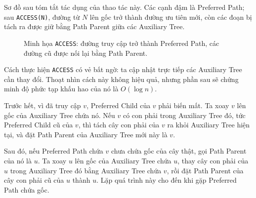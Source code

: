 \documentclass[11pt]{article}
\begin{document}
Sơ đồ sau tóm tắt tác dụng của thao tác này. Các cạnh đậm là Preferred Path;
sau \texttt{ACCESS(N)}, đường từ \(N\) lên gốc trở thành đường ưu tiên mới, còn
các đoạn bị tách ra được giữ bằng Path Parent giữa các Auxiliary Tree.

\begin{figure}[ht]
\centering
{}
\caption{Minh họa \texttt{ACCESS}: đường truy cập trở thành Preferred Path, các đường cũ được nối lại bằng Path Parent.}
\end{figure}

Cách thực hiện \texttt{ACCESS} có vẻ bất ngờ: ta cập nhật trực tiếp các
Auxiliary Tree cần thay đổi. Thoạt nhìn cách này không hiệu quả, nhưng phần
sau sẽ chứng minh độ phức tạp khấu hao của nó là $O(\log n)$.

Trước hết, vì đã truy cập $v$, Preferred Child của $v$ phải biến mất. Ta xoay
$v$ lên gốc của Auxiliary Tree chứa nó. Nếu $v$ có con phải trong Auxiliary
Tree đó, tức Preferred Child cũ của $v$, thì tách cây con phải của $v$ ra khỏi
Auxiliary Tree hiện tại, và đặt Path Parent của Auxiliary Tree mới này là
$v$.

Sau đó, nếu Preferred Path chứa $v$ chưa chứa gốc của cây thật, gọi Path Parent
của nó là $u$. Ta xoay $u$ lên gốc của Auxiliary Tree chứa $u$, thay cây con
phải của $u$ trong Auxiliary Tree đó bằng Auxiliary Tree chứa $v$, rồi đặt
Path Parent của cây con phải cũ của $u$ thành $u$. Lặp quá trình này cho đến
khi gặp Preferred Path chứa gốc.
\end{document}
